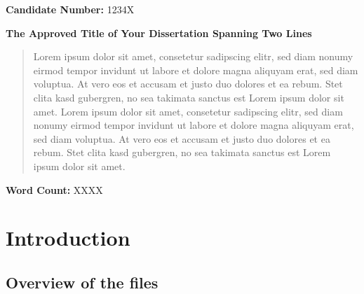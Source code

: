 \documentclass[12pt,a4paper]{article}
\begin{document}

\pagestyle{empty}

{\noindent \large \textbf{Candidate Number: }1234X}

\vspace*{45mm}

\begin{spacing}{1.5}
\centering
\noindent \Huge \textbf{The Approved Title of Your Dissertation Spanning Two Lines}
\end{spacing}

\vspace*{15mm}

\begin{abstract}
Lorem ipsum dolor sit amet, consetetur sadipscing elitr, sed diam nonumy eirmod
tempor invidunt ut labore et dolore magna aliquyam erat, sed diam voluptua. At
vero eos et accusam et justo duo dolores et ea rebum. Stet clita kasd gubergren,
no sea takimata sanctus est Lorem ipsum dolor sit amet. Lorem ipsum dolor sit
amet, consetetur sadipscing elitr, sed diam nonumy eirmod tempor invidunt ut
labore et dolore magna aliquyam erat, sed diam voluptua. At vero eos et accusam
et justo duo dolores et ea rebum. Stet clita kasd gubergren, no sea takimata
sanctus est Lorem ipsum dolor sit amet.
\end{abstract}

\vfill

{\noindent \large \textbf{Word Count: }XXXX}

\clearpage              %


%
%
%


\pagestyle{headings}

\section{Introduction}

\subsection{Overview of the files}
\end{document}
